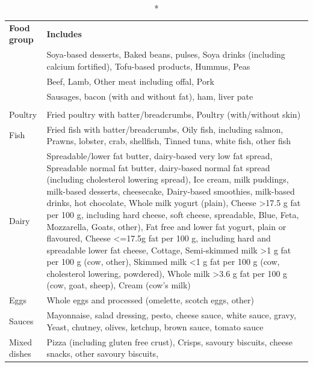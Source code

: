 \documentclass[sn-basic,Numbered,pdflatex]{sn-jnl}
\begin{document}
\begingroup
\setlength{}
\setlength{}\fontsize{9.8pt}{11.7pt}\selectfont
\begin{longtable}{@{\extracolsep{\fill}}>{\raggedright\arraybackslash}p{}>{\raggedright\arraybackslash}p{}}
\caption*{
{\large \textbf{Supplementary table 1. Summary of included foods for each food group.}}
} \\ 
\toprule
\textbf{Food group} & \textbf{Includes} \\ 
\midrule\addlinespace[2.5pt]
{\bfseries Legumes} & Soya-based desserts, Baked beans, pulses, Soya drinks (including calcium fortified),
  Tofu-based products, Hummus, Peas \\ 
{\bfseries Red meat} & Beef, Lamb, Other meat including offal, Pork \\ 
{\bfseries Processed meat} & Sausages, bacon (with and without fat), ham, liver pate \\ 
{\bfseries Animal-based foods} &   \\ 
Poultry & Fried poultry with batter/breadcrumbs, Poultry (with/without skin) \\ 
Fish & Fried fish with batter/breadcrumbs, Oily fish, including salmon, Prawns, lobster, crab, shellfish,
  Tinned tuna, white fish, other fish \\ 
Dairy & Spreadable/lower fat butter, dairy-based very low fat spread, Spreadable normal fat butter, dairy-based normal fat spread (including cholesterol lowering spread),
  Ice cream, milk puddings, milk-based desserts, cheesecake, Dairy-based smoothies, milk-based drinks, hot chocolate,
  Whole milk yogurt (plain), Cheese >17.5 g fat per 100 g, including hard cheese, soft cheese, spreadable, Blue, Feta, Mozzarella, Goats, other),
  Fat free and lower fat yogurt, plain or flavoured, Cheese <=17.5g fat per 100 g, including hard and spreadable lower fat cheese, Cottage,
  Semi-skimmed milk >1 g fat per 100 g (cow, other), Skimmed milk <1 g fat per 100 g (cow, cholesterol lowering, powdered),
  Whole milk >3.6 g fat per 100 g (cow, goat, sheep), Cream (cow's milk) \\ 
Eggs & Whole eggs and processed (omelette, scotch eggs, other) \\ 
Sauces & Mayonnaise, salad dressing, pesto, cheese sauce, white sauce, gravy, Yeast, chutney, olives, ketchup, brown sauce, tomato sauce \\ 
Mixed dishes & Pizza (including gluten free crust), Crisps, savoury biscuits, cheese snacks, other savoury biscuits,

\end{longtable}
\end{document}
